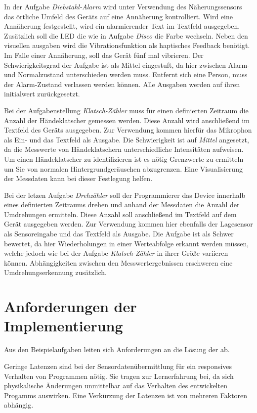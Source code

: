 \documentclass[11pt,a4paper]{report}
\begin{document}
In der Aufgabe \textit{Diebstahl-Alarm} wird unter Verwendung des Näherungssensors das örtliche Umfeld des Geräts auf eine Annäherung kontrolliert.
Wird eine Annäherung festgestellt, wird ein alarmierender Text im Textfeld ausgegeben.
Zusätzlich soll die LED die wie in Aufgabe \textit{Disco} die Farbe wechseln.
Neben den visuellen ausgaben wird die Vibrationsfunktion als haptisches Feedback benötigt.
Im Falle einer Annäherung, soll das Gerät fünf mal vibrieren.
Der Schwierigkeitsgrad der Aufgabe ist als Mittel eingestuft, da hier zwischen Alarm- und Normalzustand unterschieden werden muss.
Entfernt sich eine Person, muss der Alarm-Zustand verlassen werden können.
Alle Ausgaben werden auf ihren initialwert zurückgesetzt.

Bei der Aufgabenstellung \textit{Klatsch-Zähler} muss für einen definierten Zeitraum die Anzahl der Händeklatscher gemessen werden.
Diese Anzahl wird anschließend im Textfeld des Geräts ausgegeben.
Zur Verwendung kommen hierfür das Mikrophon als Ein- und das Textfeld als Ausgabe.
Die Schwierigkeit ist auf \textit{Mittel} angesetzt, da die Messwerte von Händeklatschern unterschiedliche Intensitäten aufweisen.
Um einen Händeklatscher zu identifizieren ist es nötig Grenzwerte zu ermitteln um Sie von normalen Hintergrundgeräuschen abzugrenzen.
Eine Visualisierung der Messdaten kann bei dieser Festlegung helfen.

Bei der letzen Aufgabe \textit{Drehzähler} soll der Programmierer das Device innerhalb eines definierten Zeitraums drehen und anhand der Messdaten die Anzahl der Umdrehungen ermitteln.
Diese Anzahl soll anschließend im Textfeld auf dem Gerät ausgegeben werden.
Zur Verwendung kommen hier ebenfalls der Lagesensor als Sensoreingabe und das Textfeld als Ausgabe.
Die Aufgabe ist als Schwer bewertet, da hier Wiederholungen in einer Werteabfolge erkannt werden müssen, welche jedoch wie bei der Aufgabe \textit{Klatsch-Zähler} in ihrer Größe variieren können.
Abhängigkeiten zwischen den Messwertergebnissen erschweren eine Umdrehungserkennung zusätzlich.

\section{Anforderungen der Implementierung}\label{sec:anforderungen}
Aus den Beispielaufgaben leiten sich Anforderungen an die Lösung der ab.

Geringe Latenzen sind bei der Sensordatenübermittlung für ein responsives Verhalten von Programmen nötig.
Sie tragen zur Lernerfahrung bei, da sich physikalische Änderungen unmittelbar auf das Verhalten des entwickelten Progamms auswirken.
Eine Verkürzung der Latenzen ist von mehreren Faktoren abhängig.
\end{document}
